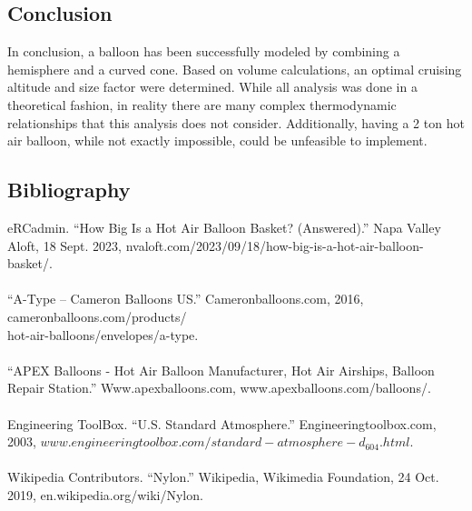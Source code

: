 \documentclass{article}
\begin{document}
\subsection*{Conclusion}
In conclusion, a balloon has been successfully modeled by combining a hemisphere and a curved cone. Based on volume calculations, an optimal cruising altitude and size factor were determined. While all analysis was done in a theoretical fashion, in reality there are many complex thermodynamic relationships that this analysis does not consider. Additionally, having a 2 ton hot air balloon, while not exactly impossible, could be unfeasible to implement. 


\subsection*{Bibliography}

eRCadmin. “How Big Is a Hot Air Balloon Basket? (Answered).” Napa Valley Aloft, 18 Sept. 2023, nvaloft.com/2023/09/18/how-big-is-a-hot-air-balloon-basket/.
\\
\\
“A-Type – Cameron Balloons US.” Cameronballoons.com, 2016, cameronballoons.com/products/ \\
hot-air-balloons/envelopes/a-type. 
\\
\\
“APEX Balloons - Hot Air Balloon Manufacturer, Hot Air Airships, Balloon Repair Station.” Www.apexballoons.com, www.apexballoons.com/balloons/.
\\
\\
Engineering ToolBox. “U.S. Standard Atmosphere.” Engineeringtoolbox.com, 2003, $www.engineeringtoolbox.com/standard-atmosphere-d_604.html.$
\\
\\
Wikipedia Contributors. “Nylon.” Wikipedia, Wikimedia Foundation, 24 Oct. 2019, en.wikipedia.org/wiki/Nylon.
\end{document}
